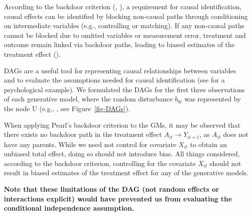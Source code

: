 \documentclass[
  11pt,
  a4paper,
]{article}
\begin{document}
According to the backdoor criterion (, ), a requirement for causal
identification, causal effects can be identified by blocking non-causal
paths through conditioning on intermediate variables (e.g., controlling
or matching). If any non-causal paths cannot be blocked due to omitted
variables or measurement error, treatment and outcome remain linked via
backdoor paths, leading to biased estimates of the treatment effect
().

DAGs are a useful tool for representing causal relationships between
variables and to evaluate the assumptions needed for causal
identification (see 
for a psychological example). We formulated the DAGs for the first three
observations of each generative model, where the random disturbance
\(b_{0i}\) was represented by the node U (e.g.,
, see
Figure~\ref{fig-DAGs}).

When applying Pearl's backdoor criterion to the GMs, it may be observed
that there exists no backdoor path in the treatment effect
\(A_{it} \to Y_{it+1}\), as \(A_{it}\) does not have any parents. While
we need not control for covariate \(X_{it}\) to obtain an unbiased total
effect, doing so should not introduce bias. All things considered,
according to the backdoor criterion, controlling for the covariate
\(X_{it}\) should not result in biased estimates of the treatment effect
for any of the generative models.

\textbf{Note that these limitations of the DAG (not random effects or
interactions explicit) would have prevented us from evaluating the
conditional independence assumption.}
\end{document}
